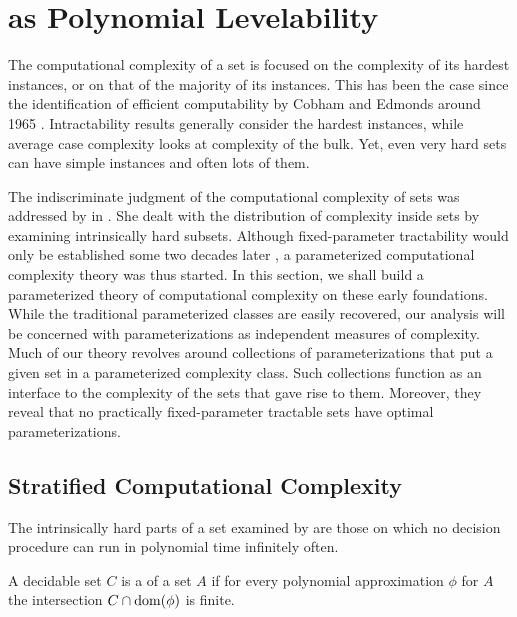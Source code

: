\section{as Polynomial Levelability}

The computational complexity of a set is focused on the complexity of its hardest instances, or on that of the majority of its instances.
This has been the case since the identification of efficient computability by Cobham and Edmonds around 1965 \parencite[see][]{goldreich2008computational}.
Intractability results \parencite{cook1971complexity,garey1979computers} generally consider the hardest instances, while average case complexity looks at complexity of the bulk.
Yet, even very hard sets can have simple instances and often lots of them.

The indiscriminate judgment of the computational complexity of sets was addressed by \textcite{lynch1975reducibility} in \citeyear{lynch1975reducibility}.
She dealt with the distribution of complexity inside sets by examining intrinsically hard subsets.
Although fixed-parameter tractability would only be established some two decades later \parencite{downey1992fixed}, a parameterized computational complexity theory was thus started.
In this section, we shall build a parameterized theory of computational complexity on these early foundations.
While the traditional parameterized classes are easily recovered, our analysis will be concerned with parameterizations as independent measures of complexity.
Much of our theory revolves around collections of parameterizations that put a given set in a parameterized complexity class.
Such collections function as an interface to the complexity of the sets that gave rise to them.
Moreover, they reveal that no practically fixed-parameter tractable sets have optimal parameterizations.

\subsection{Stratified Computational Complexity}
The intrinsically hard parts of a set examined by \citeauthor{lynch1975reducibility} are those on which no decision procedure can run in polynomial time infinitely often.
\begin{definition}
  A decidable set $C$ is a  of a set $A$ if for every polynomial approximation $\phi$ for $A$ the intersection $C \cap \operatorname{dom}(\phi)$ is finite.
\end{definition}

